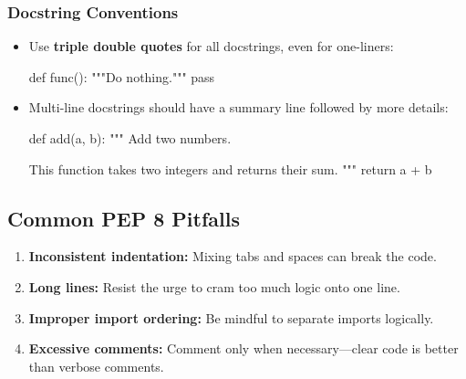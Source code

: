 \documentclass[
  letterpaper,
  DIV=11,
  numbers=noendperiod]{scrreprt}
\newenvironment{Shaded}{\begin{snugshade}}{\end{snugshade}}
\newcommand{\CommentTok}[1]{\textcolor[rgb]{0.37,0.37,0.37}{#1}}
\newcommand{\ControlFlowTok}[1]{\textcolor[rgb]{0.00,0.23,0.31}{#1}}
\newcommand{\KeywordTok}[1]{\textcolor[rgb]{0.00,0.23,0.31}{#1}}
\newcommand{\NormalTok}[1]{\textcolor[rgb]{0.00,0.23,0.31}{#1}}
\newcommand{\OperatorTok}[1]{\textcolor[rgb]{0.37,0.37,0.37}{#1}}
\providecommand{\tightlist}{%
  \setlength{\itemsep}{0pt}\setlength{\parskip}{0pt}}\usepackage{longtable,booktabs,array}
\begin{document}
\hypertarget{docstring-conventions}{%
\subsubsection{Docstring Conventions}\label{docstring-conventions}}

\begin{itemize}
\item
  Use \textbf{triple double quotes} for all docstrings, even for
  one-liners:

\begin{Shaded}
\begin{Highlighting}[]
\KeywordTok{def}\NormalTok{ func():}
    \CommentTok{"""Do nothing."""}
    \ControlFlowTok{pass}
\end{Highlighting}
\end{Shaded}
\item
  Multi-line docstrings should have a summary line followed by more
  details:

\begin{Shaded}
\begin{Highlighting}[]
\KeywordTok{def}\NormalTok{ add(a, b):}
    \CommentTok{"""}
\CommentTok{    Add two numbers.}

\CommentTok{    This function takes two integers and returns their sum.}
\CommentTok{    """}
    \ControlFlowTok{return}\NormalTok{ a }\OperatorTok{+}\NormalTok{ b}
\end{Highlighting}
\end{Shaded}
\end{itemize}

\hypertarget{common-pep-8-pitfalls}{%
\subsection{Common PEP 8 Pitfalls}\label{common-pep-8-pitfalls}}

\begin{enumerate}
\def\labelenumi{\arabic{enumi}.}
\tightlist
\item
  \textbf{Inconsistent indentation:} Mixing tabs and spaces can break
  the code.
\item
  \textbf{Long lines:} Resist the urge to cram too much logic onto one
  line.
\item
  \textbf{Improper import ordering:} Be mindful to separate imports
  logically.
\item
  \textbf{Excessive comments:} Comment only when necessary---clear code
  is better than verbose comments.
\end{enumerate}
\end{document}
